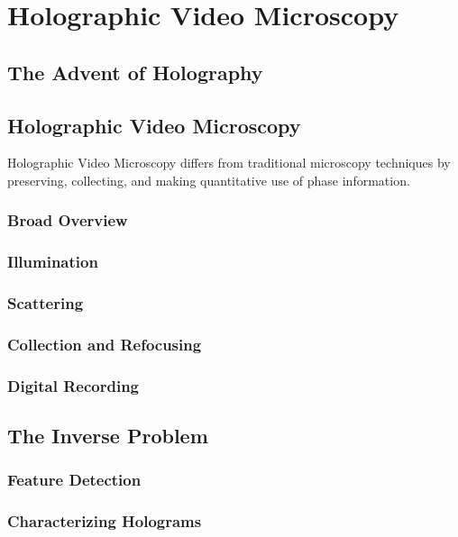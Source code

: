 \chapter{Holographic Video Microscopy}
\label{ch:hvm}


\section{The Advent of Holography}




\section{Holographic Video Microscopy}

Holographic Video Microscopy differs from
traditional microscopy techniques by preserving,
collecting, and making quantitative use of phase
information.
\subsection{Broad Overview}


% 

\subsection{Illumination}



\subsection{Scattering}

  

\subsection{Collection and Refocusing}

\subsection{Digital Recording}

\section{The Inverse Problem}

\subsection{Feature Detection}

\subsection{Characterizing Holograms}
